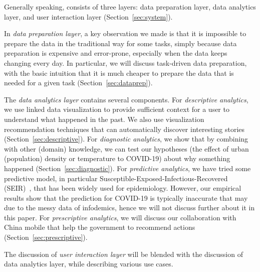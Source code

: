 Generally speaking, \sys consists of three layers: data preparation layer, data analytics layer, and user interaction layer (Section~\ref{sec:system}).


In {\em data preparation layer}, a key observation we made is that it is impossible to prepare the data in the traditional way for some tasks, simply because data preparation is expensive and error-prone, especially when the data keeps changing every day. In particular, we will discuss task-driven data preparation, with the basic intuition that it is much cheaper to prepare the data that is needed for a given task (Section~\ref{sec:dataprep}).

The {\em data analytics layer} contains several components.
%
For {\em descriptive analytics}, we use linked data visualization to provide sufficient context for a user to understand what happened in the past. We also use visualization recommendation techniques that can automatically discover interesting stories (Section~\ref{sec:descriptive}).
%
For {\em diagnostic analytics}, we show that by combining with other (domain) knowledge, we can test our hypotheses (\eg the effect of urban (population) density or temperature to COVID-19) about why something happened (Section~\ref{sec:diagnostic}). 
%
For {\em predictive analytics}, we have tried some predictive model, in particular Susceptible-Exposed-Infectious-Recovered (SEIR)~\cite{carcione2020simulation1}, that has been widely used for epidemiology. However, our empirical results show that the prediction for COVID-19 is typically inaccurate that may due to the messy data of infodemics, hence we will not discuss further about it in this paper.
%
For {\em prescriptive analytics}, we will discuss our collaboration with China mobile that help the government to recommend actions (Section~\ref{sec:prescriptive}).

The discussion of {\em user interaction layer} will be blended with the discussion of data analytics layer, while describing various use cases.
